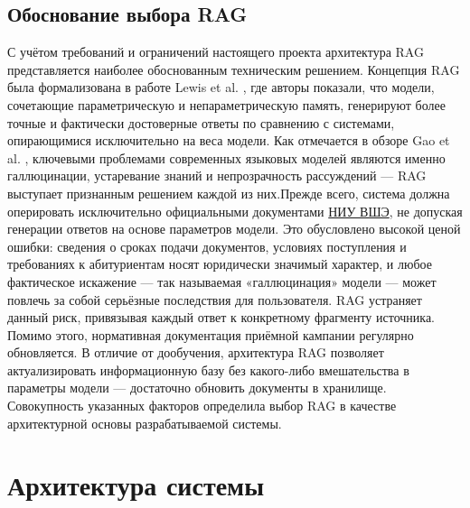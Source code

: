 \documentclass{article}
\begin{document}
\subsection{Обоснование выбора RAG}
С учётом требований и ограничений настоящего проекта архитектура RAG представляется наиболее обоснованным техническим решением. Концепция RAG была формализована в работе Lewis et al. \cite{1}, где авторы показали, что модели, сочетающие параметрическую и непараметрическую память, генерируют более точные и фактически достоверные ответы по сравнению с системами, опирающимися исключительно на веса модели. Как отмечается в обзоре Gao et al. \cite{3}, ключевыми проблемами современных языковых моделей являются именно галлюцинации, устаревание знаний и непрозрачность рассуждений --- RAG выступает признанным решением каждой из них.Прежде всего, система должна оперировать исключительно официальными документами \href{https://ba.hse.ru/docs}{НИУ ВШЭ}, не допуская генерации ответов на основе параметров модели. Это обусловлено высокой ценой ошибки: сведения о сроках подачи документов, условиях поступления и требованиях к абитуриентам носят юридически значимый характер, и любое фактическое искажение --- так называемая «галлюцинация» модели --- может повлечь за собой серьёзные последствия для пользователя. RAG устраняет данный риск, привязывая каждый ответ к конкретному фрагменту источника.
Помимо этого, нормативная документация приёмной кампании регулярно обновляется. В отличие от дообучения, архитектура RAG позволяет актуализировать информационную базу без какого-либо вмешательства в параметры модели --- достаточно обновить документы в хранилище.
Совокупность указанных факторов определила выбор RAG в качестве архитектурной основы разрабатываемой системы. 

\newpage

\section{Архитектура системы}
\end{document}
